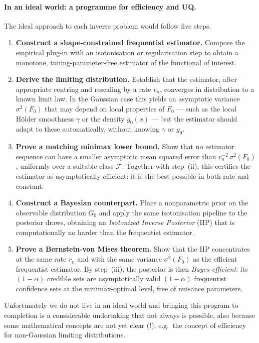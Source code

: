 \paragraph{In an ideal world: a programme for efficiency and UQ.}
The ideal approach to each inverse problem would follow five steps.
\begin{enumerate}[leftmargin=*, label=(\roman*)]
  \item \textbf{Construct a shape-constrained frequentist estimator.} Compose the empirical plug-in with an isotonisation or regularisation step to obtain a monotone, tuning-parameter-free estimator of the functional of interest.
  \item \textbf{Derive the limiting distribution.} Establish that the estimator, after appropriate centring and rescaling by a rate $r_n$, converges in distribution to a known limit law. In the Gaussian case this yields an asymptotic variance $\sigma^2(F_0)$ that may depend on local properties of $F_0$ --- such as the local H\"{o}lder smoothness $\gamma$ or the density $g_0(x)$ --- but the estimator should adapt to these automatically, without knowing $\gamma$ or $g_0$.
  \item \textbf{Prove a matching minimax lower bound.} Show that no estimator sequence can have a smaller asymptotic mean squared error than $r_n^{-2}\,\sigma^2(F_0)$, uniformly over a suitable class $\mathcal{F}$. Together with step~(ii), this certifies the estimator as asymptotically efficient: it is the best possible in both rate and constant.
  \item \textbf{Construct a Bayesian counterpart.} Place a nonparametric prior on the observable distribution $G_0$ and apply the same isotonisation pipeline to the posterior draws, obtaining an \textit{Isotonized Inverse Posterior} (IIP) that is computationally no harder than the frequentist estimator.
  \item \textbf{Prove a Bernstein-von Mises theorem.} Show that the IIP concentrates at the same rate $r_n$ and with the same variance $\sigma^2(F_0)$ as the efficient frequentist estimator. By step~(iii), the posterior is then \textit{Bayes-efficient}: its $(1-\alpha)$ credible sets are asymptotically valid $(1-\alpha)$ frequentist confidence sets at the minimax-optimal level, free of nuisance parameters.
\end{enumerate}
Unfortunately we do not live in an ideal world and bringing this program to completion is a considerable undertaking that not always is possible, also because some mathematical concepts are not yet clear (!), e.g.\ the concept of efficiency for non-Gaussian limiting distributions.

